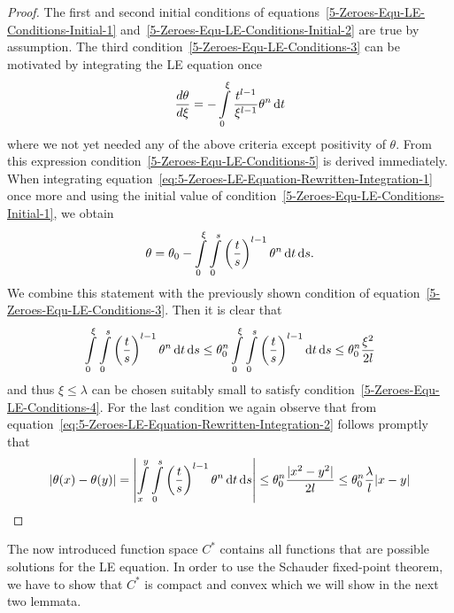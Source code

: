 \begin{proof}
	The first and second initial conditions of equations~\eqref{5-Zeroes-Equ-LE-Conditions-Initial-1} and~\eqref{5-Zeroes-Equ-LE-Conditions-Initial-2} are true by assumption.
	The third condition~\eqref{5-Zeroes-Equ-LE-Conditions-3} can be motivated by integrating the \ac{LE} equation once
	\begin{equation}
		\frac{d\theta}{d\xi} = -\int\limits_0^\xi \frac{t^{l-1}}{\xi^{l-1}}\theta^n \mathop{}\!\mathrm{d} t
		\label{eq:5-Zeroes-LE-Equation-Rewritten-Integration-1}
	\end{equation}
	where we not yet needed any of the above criteria except positivity of $\theta$.
	From this expression condition~\eqref{5-Zeroes-Equ-LE-Conditions-5} is derived immediately.
	When integrating equation~\eqref{eq:5-Zeroes-LE-Equation-Rewritten-Integration-1} once more and using the initial value of condition~\eqref{5-Zeroes-Equ-LE-Conditions-Initial-1}, we obtain
	\begin{equation}
		\theta = \theta_0 -\int\limits_0^\xi\int\limits_0^s \left(\frac{t}{s}\right)^{l-1}\theta^n \mathop{}\!\mathrm{d} t \mathop{}\!\mathrm{d} s.
		\label{eq:5-Zeroes-LE-Equation-Rewritten-Integration-2}
	\end{equation}
	We combine this statement with the previously shown condition of equation~\eqref{5-Zeroes-Equ-LE-Conditions-3}.
	Then it is clear that
	\begin{equation}
		\int\limits_0^\xi\int\limits_0^s \left(\frac{t}{s}\right)^{l-1}\theta^n \mathop{}\!\mathrm{d} t \mathop{}\!\mathrm{d} s \leq \theta_0^n\int\limits_0^\xi\int\limits_0^s \left(\frac{t}{s}\right)^{l-1} \mathop{}\!\mathrm{d} t \mathop{}\!\mathrm{d} s \leq \theta_0^n\frac{\xi^2}{2l}
		\label{eq:5-Zeroes-LE-Equation-Rewritten-Inequality}
	\end{equation}
	and thus $\xi\leq\lambda$ can be chosen suitably small to satisfy condition~\eqref{5-Zeroes-Equ-LE-Conditions-4}.
	For the last condition we again observe that from equation~\eqref{eq:5-Zeroes-LE-Equation-Rewritten-Integration-2} follows promptly that
	\begin{equation}
		|\theta(x)-\theta(y)| = \left|\int\limits_x^y\int\limits_0^s \left(\frac{t}{s}\right)^{l-1}\theta^n \mathop{}\!\mathrm{d} t \mathop{}\!\mathrm{d} s\right| \leq \theta^n_0\frac{|x^2-y^2|}{2l} \leq \theta^n_0\frac{\lambda}{l}|x-y|
		\label{eq:5-Zeroes-LE-Equation-Rewritten-Inequality-2}
	\end{equation}
\end{proof}\noindent
The now introduced function space $C^*$ contains all functions that are possible solutions for the \ac{LE} equation.
In order to use the Schauder fixed-point theorem, we have to show that $C^*$ is compact and convex which we will show in the next two lemmata.
